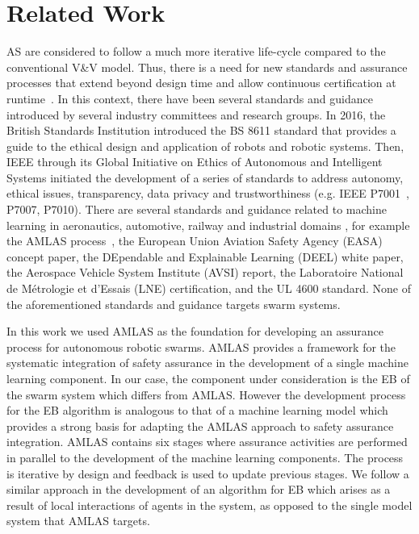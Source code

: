 \documentclass[runningheads]{llncs}
\begin{document}
\section{Related Work}\label{relatedwork}%
AS are considered to follow a much more iterative life-cycle compared to the conventional V\&V model. 
Thus, there is a need for new standards and assurance processes that extend beyond design time and allow continuous certification at runtime~\cite{Rushby2008}. 
In this context, there have been several standards and guidance introduced by several industry committees and research groups. In 2016, the British Standards Institution introduced the BS 8611 standard that provides a guide to the ethical design and application of robots and robotic systems. %
Then, IEEE through its Global Initiative on Ethics of Autonomous and Intelligent Systems initiated the development of a series of standards to address autonomy, ethical issues, transparency, data privacy and trustworthiness (e.g. IEEE P7001~\cite{IEEE-P7001}, P7007, P7010). 
There are several standards and guidance related to machine learning in aeronautics, automotive, railway and industrial domains \cite{Kaakai2022}, for example the AMLAS process~\cite{Hawkins2021}, the European Union Aviation Safety Agency (EASA) concept paper, the DEpendable and Explainable Learning (DEEL) white paper, the Aerospace Vehicle System Institute (AVSI) report, the Laboratoire National de Métrologie et d'Essais (LNE) certification, and the UL 4600 standard. None of the aforementioned standards and guidance targets swarm systems.

In this work we used AMLAS \cite{Hawkins2021} as the foundation for developing an assurance process for autonomous robotic swarms. AMLAS provides a framework for the systematic integration of safety assurance in the development of a single machine learning component. In our case, the component under consideration is the EB of the swarm system which differs from AMLAS. However the development process for the EB algorithm is analogous to that of a machine learning model which provides a strong basis for adapting the AMLAS approach to safety assurance integration.
AMLAS contains six stages where assurance activities are performed in parallel to the development of the machine learning components. The process is iterative by design and feedback is used to update previous stages. We follow a similar approach in the development of an algorithm for EB which arises as a result of local interactions of agents in the system, as opposed to the single model system that AMLAS targets.
\end{document}
